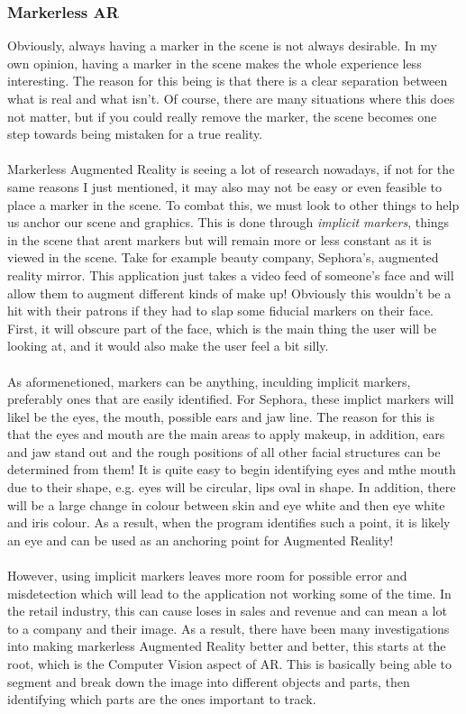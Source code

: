 \documentclass[11pt]{article}
\begin{document}
\subsubsection{Markerless AR}
Obviously, always having a marker in the scene is not always desirable.
In my own opinion, having a marker in the scene makes the whole
experience less interesting. The reason for this being is that there is
a clear separation between what is real and what isn't. Of course, there
are many situations where this does not matter, but if you could really
remove the marker, the scene becomes one step towards being mistaken
for a true reality.\\
\\
Markerless Augmented Reality is seeing a lot of research nowadays, if not
for the same reasons I just mentioned, it may also may not be easy or
even feasible to place a marker in the scene. To combat this, we must
look to other things to help us anchor our scene and graphics. This is done
through \textit{implicit markers}, things in the scene that arent markers
but will remain more or less constant as it is viewed in the scene.
Take for example beauty company, Sephora's, augmented reality mirror.
This application just takes a video feed of someone's face and will allow
them to augment different kinds of make up! Obviously this wouldn't be
a hit with their patrons if they had to slap some fiducial markers on their 
face. First, it will obscure part of the face, which is the main thing
the user will be looking at, and it would also make the user feel a bit 
silly. \\
\\
As aformenetioned, markers can be anything, inculding implicit markers,
preferably ones that are easily identified. For Sephora, these implict
markers will likel be the eyes, the mouth, possible ears and jaw line.
The reason for this is that the eyes and mouth are the main areas to
apply makeup, in addition, ears and jaw stand out and the rough positions
of all other facial structures can be determined from them! It is quite
easy to begin identifying eyes and mthe mouth due to their shape, 
e.g. eyes will be circular, lips oval in shape. In addition, there will
be a large change in colour between skin and eye white and then eye white
and iris colour. As a result, when the program identifies such a point, it
is likely an eye and can be used as an anchoring point for Augmented Reality!\\
\\
However, using implicit markers leaves more room for possible error and
misdetection which will lead to the application not working some of the
time. In the retail industry, this can cause loses in sales and revenue 
and can mean a lot to a company and their image. As a result, there
have been many investigations into making markerless Augmented Reality
better and better, this starts at the root, which is the Computer
Vision aspect of AR. This is basically being able to segment and break
down the image into different objects and parts, then identifying which
parts are the ones important to track.
\end{document}
